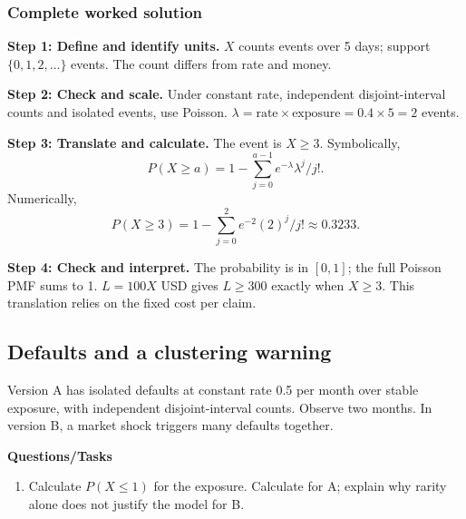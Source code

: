 \subsubsection*{Complete worked solution}
\par\noindent\begin{minipage}{\linewidth}
\textbf{Step 1: Define and identify units.} $X$ counts events over 5 days; support $\{0,1,2,\ldots\}$ events. The count differs from rate and money.
\end{minipage}\par\medskip
\par\noindent\begin{minipage}{\linewidth}
\textbf{Step 2: Check and scale.} Under constant rate, independent disjoint-interval counts and isolated events, use Poisson. $\lambda=\text{rate}\times\text{exposure}=0.4\times5=2$ events.
\end{minipage}\par\medskip
\par\noindent\begin{minipage}{\linewidth}
\textbf{Step 3: Translate and calculate.} The event is $ X\geq3$. Symbolically,
\[P(X\geq a)=1-\sum_{j=0}^{a-1}e^{-\lambda}\lambda^j/j!.\]
Numerically,
\[P(X\geq3)=1-\sum_{j=0}^{2}e^{-2}(2)^j/j!\approx 0.3233.\]
\end{minipage}\par\medskip
\par\noindent\begin{minipage}{\linewidth}
\textbf{Step 4: Check and interpret.} The probability is in $[0,1]$; the full Poisson PMF sums to 1. $L=100X$ USD gives $L\geq300$ exactly when $X\geq3$. This translation relies on the fixed cost per claim.
\end{minipage}\par\medskip
{}
\subsection{Defaults and a clustering warning}
Version A has isolated defaults at constant rate 0.5 per month over stable exposure, with independent disjoint-interval counts. Observe two months. In version B, a market shock triggers many defaults together.

\textbf{Questions/Tasks}
\begin{enumerate}
\item Calculate $P(X\leq1)$ for the exposure. Calculate for A; explain why rarity alone does not justify the model for B.
\end{enumerate}

